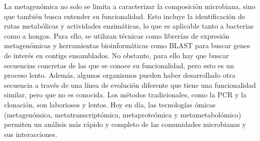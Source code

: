 La metagenómica no solo se limita a caracterizar la composición microbiana, sino que también busca entender su funcionalidad. Esto incluye la identificación de rutas metabólicas y actividades enzimáticas, lo que es aplicable tanto a bacterias como a hongos. Para ello, se utilizan técnicas como librerías de expresión metagenómicas y herramientas bioinformáticas como BLAST para buscar genes de interés en contigs ensamblados. No obstante, para ello hay que buscar secuencias concretas de las que se conoce su funcionalidad, pero esto es un proceso lento. Además, algunos organismos pueden haber desarrollado otra secuencia a través de una línea de evolución diferente que tiene una funcionalidad similar, pero que no es conocida.
Los métodos tradicionales, como la PCR y la clonación, son laboriosos y lentos. Hoy en día, las tecnologías ómicas (metagenómica, metatranscriptómica, metaproteómica y metametabolómica) permiten un análisis más rápido y completo de las comunidades microbianas y sus interacciones.

